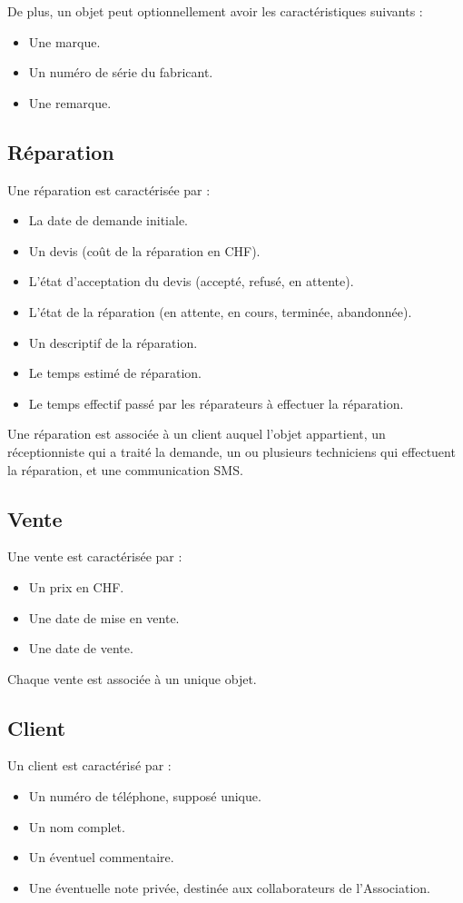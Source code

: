 \documentclass{article}
\begin{document}
De plus, un objet peut optionnellement avoir les caractéristiques suivants :
\begin{itemize}
    \item Une marque.
    \item Un numéro de série du fabricant.
    \item Une remarque.
\end{itemize}

\subsection*{Réparation}
Une réparation est caractérisée par :
\begin{itemize}
    \item La date de demande initiale.
    \item Un devis (coût de la réparation en CHF).
    \item L'état d'acceptation du devis (accepté, refusé, en attente).
    \item L'état de la réparation (en attente, en cours, terminée, abandonnée).
    \item Un descriptif de la réparation.
    \item Le temps estimé de réparation.
    \item Le temps effectif passé par les réparateurs à effectuer la réparation.
\end{itemize}

Une réparation est associée à un client auquel l'objet appartient, un réceptionniste qui a traité la demande, un ou plusieurs techniciens qui effectuent la réparation, et une communication SMS.

\subsection*{Vente}
Une vente est caractérisée par :
\begin{itemize}
    \item Un prix en CHF.
    \item Une date de mise en vente.
    \item Une date de vente.
\end{itemize}

Chaque vente est associée à un unique objet.

\subsection*{Client}
Un client est caractérisé par :
\begin{itemize}
    \item Un numéro de téléphone, supposé unique.
    \item Un nom complet.
    \item Un éventuel commentaire.
    \item Une éventuelle note privée, destinée aux collaborateurs de l'Association.
\end{itemize}
\end{document}

